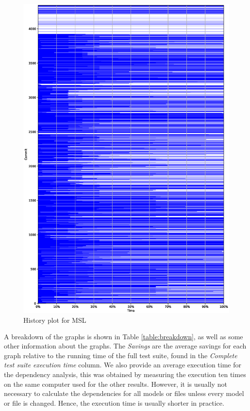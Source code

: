 \documentclass{cslthse-msc}
\begin{document}
\begin{figure}[!htbp]
    \centering
    \includegraphics[width=\textwidth]{Graphs/MSL_history_plot.eps}
    \caption{History plot for MSL}
    \label{fig:mslhistory}
\end{figure}

A breakdown of the graphs is shown in Table \ref{table:breakdown}, as well as some other information about the graphs. The \textit{Savings} are the average savings for each graph relative to the running time of the full test suite, found in the \textit{Complete test suite execution time} column. We also provide an average execution time for the dependency analysis, this was obtained by measuring the execution ten times on the same computer used for the other results. However, it is usually not necessary to calculate the dependencies for all models or files unless every model or file is changed. Hence, the execution time is usually shorter in practice.
\end{document}

